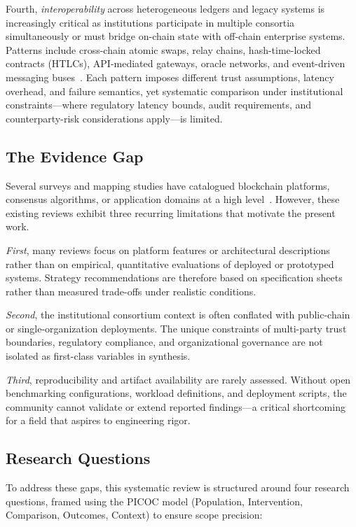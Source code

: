 \documentclass[journal]{IEEEtran}
\begin{document}
Fourth, \emph{interoperability} across heterogeneous ledgers and legacy systems is increasingly critical as institutions participate in multiple consortia simultaneously or must bridge on-chain state with off-chain enterprise systems.
Patterns include cross-chain atomic swaps, relay chains, hash-time-locked contracts (HTLCs), API-mediated gateways, oracle networks, and event-driven messaging buses~\cite{belchior2021survey,schulte2019towards}.
Each pattern imposes different trust assumptions, latency overhead, and failure semantics, yet systematic comparison under institutional constraints---where regulatory latency bounds, audit requirements, and counterparty-risk considerations apply---is limited.

\subsection{The Evidence Gap}

Several surveys and mapping studies have catalogued blockchain platforms, consensus algorithms, or application domains at a high level~\cite{casino2019systematic,wang2019blockchain,ali2020comparative}.
However, these existing reviews exhibit three recurring limitations that motivate the present work.

\emph{First}, many reviews focus on platform features or architectural descriptions rather than on empirical, quantitative evaluations of deployed or prototyped systems.
Strategy recommendations are therefore based on specification sheets rather than measured trade-offs under realistic conditions.

\emph{Second}, the institutional consortium context is often conflated with public-chain or single-organization deployments.
The unique constraints of multi-party trust boundaries, regulatory compliance, and organizational governance are not isolated as first-class variables in synthesis.

\emph{Third}, reproducibility and artifact availability are rarely assessed.
Without open benchmarking configurations, workload definitions, and deployment scripts, the community cannot validate or extend reported findings---a critical shortcoming for a field that aspires to engineering rigor.

\subsection{Research Questions}

To address these gaps, this systematic review is structured around four research questions, framed using the PICOC model (Population, Intervention, Comparison, Outcomes, Context) to ensure scope precision:
\end{document}
